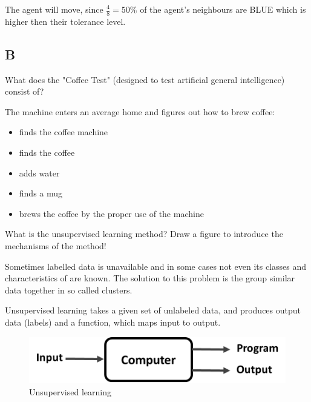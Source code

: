 \documentclass[a4paper,12pt,answers]{exam}
\begin{document}
\begin{questions}
	\begin{solution}
		The agent will move, since $\frac{4}{8} = 50\%$ of the agent's neighbours are BLUE which is higher then their tolerance level.
	\end{solution}
\end{questions}
\newpage
\subsection{B}
\begin{questions}
	\question[10]
	What does the "Coffee Test" (designed to test artificial general intelligence) consist of?
	
	\begin{solution}
		The machine enters an average home and figures out how to brew coffee:
		\begin{itemize}
			\item finds the coffee machine
			\item finds the coffee
			\item adds water
			\item finds a mug
			\item brews the coffee by the proper use of the machine
		\end{itemize}
	\end{solution}
	
	\question[15]
	What is the unsupervised learning method? Draw a figure to introduce the mechanisms of the method!
	
	\begin{solution}
		Sometimes labelled data is unavailable and in some cases not even its classes and characteristics of are known. The solution to this problem is the group similar data together in so called clusters.
			
		Unsupervised learning takes a given set of unlabeled data, and produces output data (labels) and a function, which maps input to output.
		
		\begin{figure}[H]
			\centering
			\includegraphics[width=0.7\linewidth]{unsupervised_learning}
			\caption{Unsupervised learning}
			\label{fig:unsupervisedlearning}
		\end{figure}
	\end{solution}
	

\end{questions}
\end{document}
